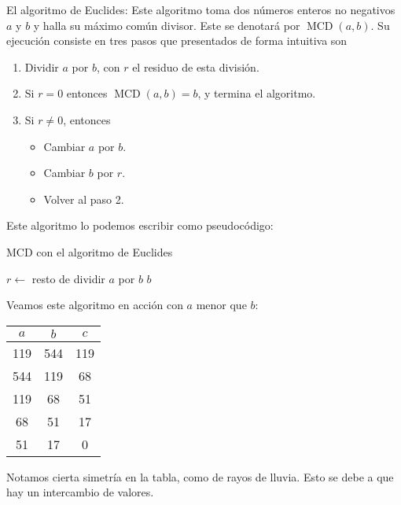 \begin{ejem}
    El algoritmo de Euclides: Este algoritmo toma dos números enteros no negativos $a$ y $b$ y halla su máximo común divisor. Este se denotará por $\operatorname{MCD}(a, b)$. Su ejecución consiste en tres pasos que presentados de forma intuitiva son

    \begin{enumerate}
        \item Dividir $a$ por $b$, con $r$ el residuo de esta división.
        \item Si $r = 0$ entonces $\operatorname{MCD}(a, b) = b$, y termina el algoritmo.
        \item Si $r \neq 0$, entonces
        
            \begin{itemize}
                \item Cambiar $a$ por $b$.
                \item Cambiar $b$ por $r$.
                \item Volver al paso 2.
            \end{itemize}
    \end{enumerate}
    
    Este algoritmo lo podemos escribir como pseudocódigo:
    
    \begin{algoritmo}[hbt!]
    \caption{MCD con el algoritmo de Euclides}\label{alg:euc}
        
        $r \gets$ resto de dividir $a$ por $b$\;
        \Return $b$
    \end{algoritmo}
    
    Veamos este algoritmo en acción con $a$ menor que $b$:
    
    \begin{center}
            \begin{tabular}{c|c|c}
                $a$ & $b$ & $c$ \\ \toprule
                119 & 544 & 119 \\
                544 & 119 & 68  \\
                119 & 68  & 51  \\
                68  & 51  & 17  \\
                51  & 17  & 0
            \end{tabular}
    \end{center}
    
    Notamos cierta simetría en la tabla, como de rayos de lluvia. Esto se debe a que hay un intercambio de valores.
\end{ejem}


